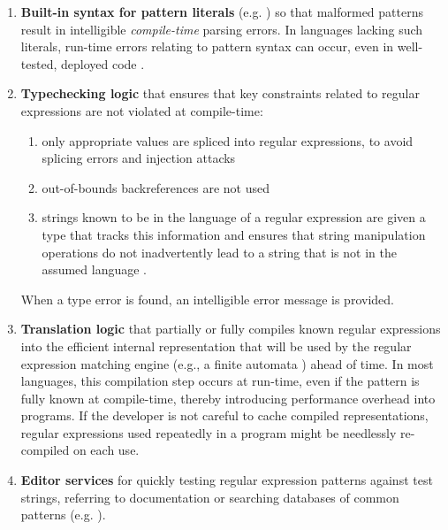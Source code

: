 \begin{enumerate}
\item \textbf{Built-in syntax for pattern literals} (e.g. \cite{perlre}) so that malformed patterns result in intelligible \emph{compile-time} parsing errors. In languages lacking such literals, run-time errors relating to pattern syntax can occur, even in well-tested, deployed code \cite{spishak2012type}. 
\item \textbf{Typechecking logic} that ensures that key constraints related to regular expressions are not violated at compile-time:
	\begin{enumerate}
	\item only appropriate values are spliced into regular expressions, to avoid splicing errors and injection attacks \cite{owasp2013}
	\item out-of-bounds backreferences are not used \cite{spishak2012type}
	\item strings known to be in the language of a regular expression are given a type that tracks this information and ensures that string manipulation operations do not inadvertently lead to a string that is not in the assumed language \cite{fulton-thesis}.
	\end{enumerate}
When a type error is found, an intelligible error message is provided.
\item \textbf{Translation logic} that partially or fully compiles known regular expressions into the efficient internal representation that will be used by the regular expression matching engine (e.g., a finite automata \cite{Thompson:1968:PTR:363347.363387}) ahead of time. In most languages, this compilation step occurs at run-time, even if the pattern is fully known at compile-time, thereby introducing performance overhead into programs. If the developer is not careful to cache compiled representations, regular expressions used repeatedly in a program might be needlessly re-compiled on each use. %
\item \textbf{Editor services} for quickly testing regular expression patterns against test strings,  referring to documentation or searching databases of common patterns (e.g. \cite{IntelliJRegexp}).
\end{enumerate}

